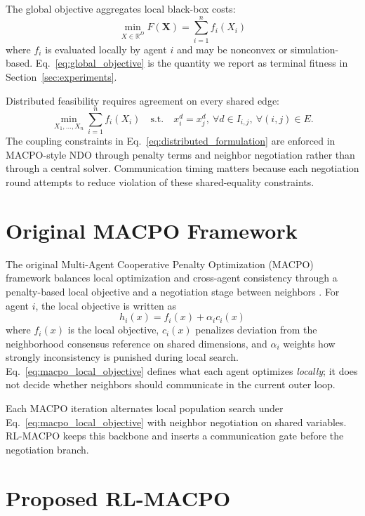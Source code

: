 \documentclass[conference]{IEEEtran}
\begin{document}
The global objective aggregates local black-box costs:
\begin{equation}
\min_{X\in\mathbb{R}^D} F(\mathbf{X}) = \sum_{i=1}^{n} f_i(X_i)
\label{eq:global_objective}
\end{equation}
where $f_i$ is evaluated locally by agent $i$ and may be nonconvex or simulation-based. Eq.~\eqref{eq:global_objective} is the quantity we report as terminal fitness in Section~\ref{sec:experiments}.

Distributed feasibility requires agreement on every shared edge:
\begin{equation}
\min_{X_1,\ldots,X_n} \sum_{i=1}^{n} f_i(X_i)
\quad \text{s.t.} \quad x_i^d = x_j^d,\ \forall d\in I_{i,j},\ \forall (i,j)\in E.
\label{eq:distributed_formulation}
\end{equation}
The coupling constraints in Eq.~\eqref{eq:distributed_formulation} are enforced in MACPO-style NDO through penalty terms and neighbor negotiation rather than through a central solver. Communication timing matters because each negotiation round attempts to reduce violation of these shared-equality constraints.

\section{Original MACPO Framework}\label{sec:macpo_prelim}
\noindent
The original Multi-Agent Cooperative Penalty Optimization (MACPO) framework balances local optimization and cross-agent consistency through a penalty-based local objective and a negotiation stage between neighbors \cite{ref_macpo}. For agent $i$, the local objective is written as
\begin{equation}
h_i(x)=f_i(x)+\alpha_i c_i(x)
\label{eq:macpo_local_objective}
\end{equation}
where $f_i(x)$ is the local objective, $c_i(x)$ penalizes deviation from the neighborhood consensus reference on shared dimensions, and $\alpha_i$ weights how strongly inconsistency is punished during local search. Eq.~\eqref{eq:macpo_local_objective} defines what each agent optimizes \emph{locally}; it does not decide whether neighbors should communicate in the current outer loop.

Each MACPO iteration alternates local population search under Eq.~\eqref{eq:macpo_local_objective} with neighbor negotiation on shared variables. RL-MACPO keeps this backbone and inserts a communication gate before the negotiation branch.

\section{Proposed RL-MACPO}\label{sec:method}
\end{document}
